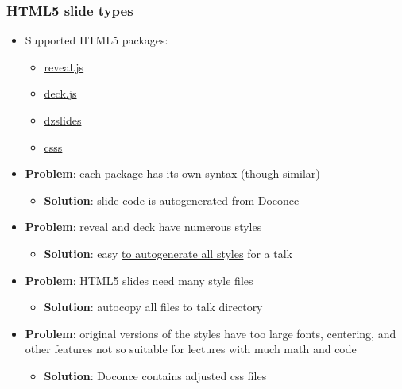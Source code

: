 \documentclass{beamer}
\newcounter{doconce:exercise:counter}
\newcounter{doconce:movie:counter}
\begin{document}
\begin{frame}
\frametitle{HTML5 slide types}

\begin{itemize}
 \item<2-> Supported HTML5 packages:
\begin{itemize}

   \item<3-> \href{{http://lab.hakim.se/reveal-js/}}{reveal.js}

   \item<4-> \href{{http://imakewebthings.com/deck.js/}}{deck.js}

   \item<5-> \href{{http://paulrouget.com/dzslides/}}{dzslides}

   \item<6-> \href{{http://leaverou.github.com/csss/#intro}}{csss}

\end{itemize}

\noindent
 \item<7-> \textbf{Problem}: each package has its own syntax (though similar)
\begin{itemize}

   \item<8-> \textbf{Solution}: slide code is autogenerated from Doconce

\end{itemize}

\noindent
 \item<9-> \textbf{Problem}: reveal and deck have numerous styles
\begin{itemize}

   \item<10-> \textbf{Solution}: easy \href{{http://hplgit.github.com/teamods/doconce/demo/index.html}}{to autogenerate all styles} for a talk

\end{itemize}

\noindent
 \item<11-> \textbf{Problem}: HTML5 slides need many style files
\begin{itemize}

   \item<12-> \textbf{Solution}: autocopy all files to talk directory

\end{itemize}

\noindent
 \item<13-> \textbf{Problem}: original versions of the styles have too large fonts,
   centering, and other features not so suitable for lectures
   with much math and code
\begin{itemize}

   \item<14-> \textbf{Solution}: Doconce contains adjusted css files
\end{itemize}

\noindent
\end{itemize}

\noindent
\end{frame}
\end{document}
